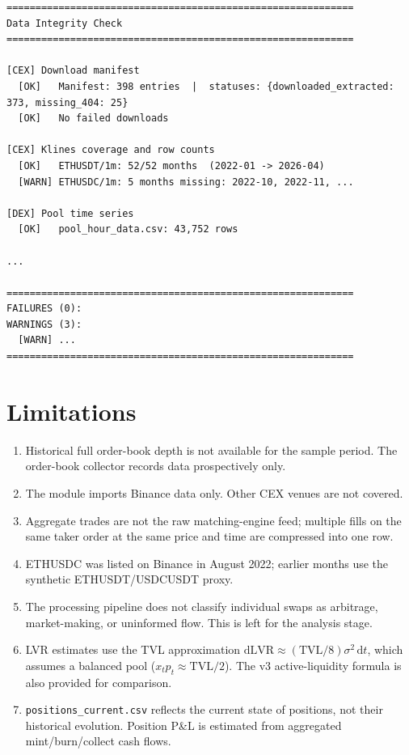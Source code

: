 \documentclass[11pt,a4paper]{article}
\begin{document}
\begin{lstlisting}
============================================================
Data Integrity Check
============================================================

[CEX] Download manifest
  [OK]   Manifest: 398 entries  |  statuses: {downloaded_extracted: 373, missing_404: 25}
  [OK]   No failed downloads

[CEX] Klines coverage and row counts
  [OK]   ETHUSDT/1m: 52/52 months  (2022-01 -> 2026-04)
  [WARN] ETHUSDC/1m: 5 months missing: 2022-10, 2022-11, ...

[DEX] Pool time series
  [OK]   pool_hour_data.csv: 43,752 rows

...

============================================================
FAILURES (0):
WARNINGS (3):
  [WARN] ...
============================================================
\end{lstlisting}

\section{Limitations}

\begin{enumerate}
    \item Historical full order-book depth is not available for the sample period. The order-book collector records data prospectively only.
    \item The module imports Binance data only. Other CEX venues are not covered.
    \item Aggregate trades are not the raw matching-engine feed; multiple fills on the same taker order at the same price and time are compressed into one row.
    \item ETHUSDC was listed on Binance in August 2022; earlier months use the synthetic ETHUSDT/USDCUSDT proxy.
    \item The processing pipeline does not classify individual swaps as arbitrage, market-making, or uninformed flow. This is left for the analysis stage.
    \item LVR estimates use the TVL approximation $\mathrm{dLVR} \approx (\mathrm{TVL}/8)\sigma^2\,\mathrm{d}t$, which assumes a balanced pool ($x_t p_t \approx \mathrm{TVL}/2$). The v3 active-liquidity formula is also provided for comparison.
    \item \texttt{positions\_current.csv} reflects the current state of positions, not their historical evolution. Position P\&L is estimated from aggregated mint/burn/collect cash flows.
\end{enumerate}
\end{document}
